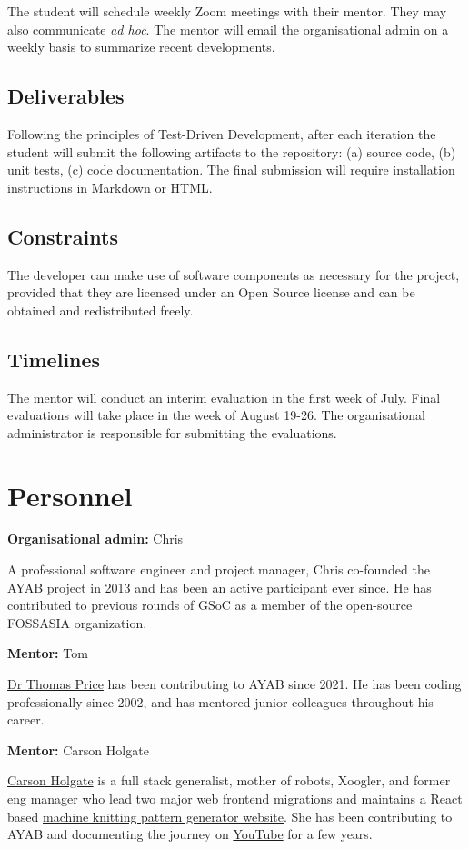 \documentclass{article}
\begin{document}
The student will schedule weekly Zoom meetings with their mentor. They may also communicate \textit{ad hoc}. The mentor will email the organisational admin on a weekly basis to summarize recent developments.

\subsection{Deliverables}
Following the principles of Test-Driven Development, after each iteration the student will submit the following artifacts to the repository: (a) source code, (b) unit tests, (c) code documentation. The final submission will require installation instructions in Markdown or HTML.

\subsection{Constraints}
The developer can make use of software components as necessary for the project, provided that they are licensed under an Open Source license and can be obtained and redistributed freely.

\subsection{Timelines}
The mentor will conduct an interim evaluation in the first week of July. Final evaluations will take place in the week of August 19-26. The organisational administrator is responsible for submitting the evaluations.


\section{Personnel}

\textbf{Organisational admin:} Chris

A professional software engineer and project manager, Chris co-founded the AYAB project in 2013 and has been an active participant ever since. He has contributed to previous rounds of GSoC as a member of the open-source FOSSASIA organization.

\textbf{Mentor:} Tom

\href{https://t0mpr1c3.github.io/}{Dr Thomas Price} has been contributing to AYAB since 2021. He has been coding professionally since 2002, and has mentored junior colleagues throughout his career.

\textbf{Mentor:} Carson Holgate

\href{https://www.linkedin.com/in/carson-holgate/}{Carson Holgate} is a full stack generalist, mother of robots, Xoogler, and former eng manager who lead two major web frontend migrations and maintains a React based \href{https://www.abstractknitfactoryfactory.com/}{machine knitting pattern generator website}. She has been contributing to AYAB and documenting the journey on \href{https://www.youtube.com/channel/UCjSd0-rGqU2NPy_iSuCqUpw/}{YouTube} for a few years.
\end{document}
